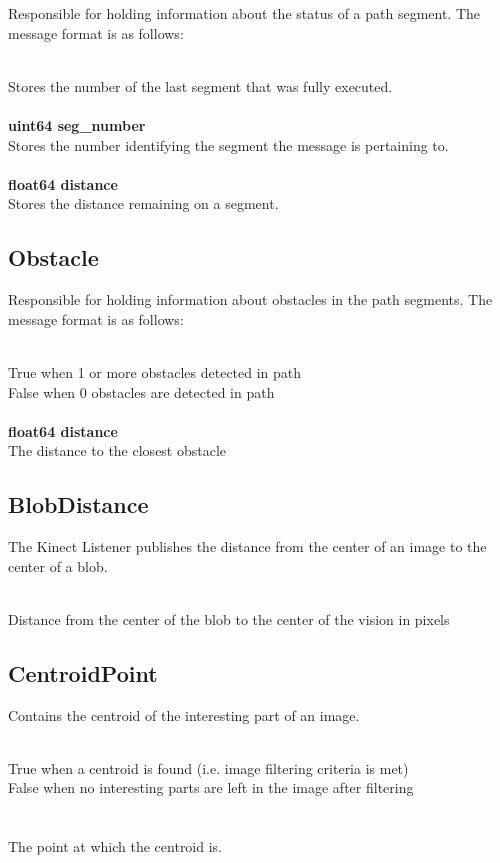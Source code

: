 Responsible for holding information about the status of a path
segment.  The message format is as follows:

\\
\indent Stores the number of the last segment that was fully executed.\\
\\
{\bf uint64 seg\_number}\\
\indent Stores the number identifying the segment the message is
pertaining to.\\
\\
{\bf float64 distance}\\
\indent Stores the distance remaining on a segment.\\

\subsection{Obstacle}

Responsible for holding information about obstacles in the path
segments.  The message format is as follows:

\\
\indent True when 1 or more obstacles detected in path\\
\indent False when 0 obstacles are detected in path\\
\\
{\bf float64 distance}\\
\indent The distance to the closest obstacle\\

\subsection{BlobDistance}
The Kinect Listener publishes the distance from the center of an image
to the center of a blob.

\\
\indent Distance from the center of the blob to the center of the vision in pixels\\

\subsection{CentroidPoint}
Contains the centroid of the interesting part of an image.

\\
\indent True when a centroid is found (i.e. image filtering criteria is met)\\
\indent False when no interesting parts are left in the image after filtering\\
\\
\\
\indent The point at which the centroid is.\\

